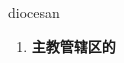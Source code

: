 
\begin{frame}
{\huge diocesan}
\begin{center}
\begin{enumerate}\Large
  \item \textbf{主教管辖区的}
\end{enumerate}
\end{center}
\end{frame}
